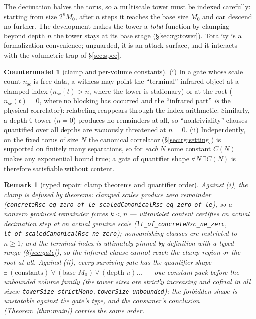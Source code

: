 \documentclass[11pt]{article}
\newtheorem{remark}[theorem]{Remark}
\theoremstyle{definition}
\newtheorem{countermodel}[theorem]{Countermodel}
\newcommand{\lean}[1]{\texttt{#1}}
\begin{document}
The decimation halves the torus, so a multiscale tower must be indexed
carefully: starting from size $2^n M_0$, after $n$ steps it reaches
the base size $M_0$ and can descend no further.  The development makes
the tower a \emph{total} function by clamping --- beyond depth $n$ the
tower stays at its base stage (\S\ref{sec:rg:tower}).  Totality is a
formalization convenience; unguarded, it is an attack surface, and it
interacts with the volumetric trap of \S\ref{sec:spec}.

\begin{countermodel}[clamp and per-volume constants]\label{cm:clamp}
(i) In a gate whose scale count $n_{\mathrm{sc}}$ is free data, a
witness may point the ``terminal'' infrared object at a clamped index
($n_{\mathrm{sc}}(t) > n$, where the tower is stationary) or at the
root ($n_{\mathrm{sc}}(t) = 0$, where no blocking has occurred and
the ``infrared part'' \emph{is} the physical correlator): relabeling
reappears through the index arithmetic.  Similarly, a depth-$0$ tower
($n = 0$) produces no remainders at all, so ``nontriviality'' clauses
quantified over all depths are vacuously threatened at $n = 0$.
(ii) Independently, on the fixed torus of size $N$ the canonical
correlator (\S\ref{sec:rg:setting}) is supported on finitely many
separations, so for \emph{each} $N$ some constant $C(N)$ makes any
exponential bound true; a gate of quantifier shape
$\forall N\, \exists C(N)$ is therefore satisfiable without content.
\end{countermodel}

\begin{remark}[typed repair: clamp theorems and quantifier order]
\label{rem:repair3}
Against (i), the clamp is \emph{defused by theorems}: clamped scales
produce \emph{zero} remainder
(\lean{concreteRsc\_eq\_zero\_of\_le},
\lean{scaledCanonicalRsc\_eq\_zero\_of\_le}), so a nonzero produced
remainder forces $k < n$ --- ultraviolet content certifies an actual
decimation step at an actual genuine scale
(\lean{lt\_of\_concreteRsc\_ne\_zero},
\lean{lt\_of\_scaledCanonicalRsc\_ne\_zero}); nonvanishing clauses are
restricted to $n \ge 1$; and the terminal index is ultimately
\emph{pinned by definition} with a typed range
(\S\ref{sec:gate}), so the infrared clause cannot reach the clamp
region or the root at all.  Against (ii), every surviving gate has the
quantifier shape
$\exists\, (\text{constants})\ \forall\, (\text{base } M_0)\
\forall\, (\text{depth } n) \dots$ --- one constant pack before the
unbounded volume family (the tower sizes are strictly increasing and
cofinal in all sizes: \lean{towerSize\_strictMono},
\lean{towerSize\_unbounded}); the forbidden shape is unstatable
against the gate's type, and the consumer's conclusion
(Theorem~\ref{thm:main}) carries the same order.
\end{remark}
\end{document}
